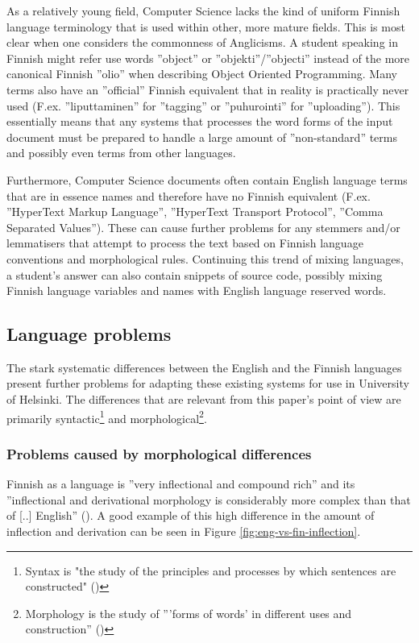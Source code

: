 \documentclass[english]{tktltiki2}
\theoremstyle{definition}
\theoremstyle{remark}
\begin{document}
As a relatively young field, Computer Science lacks the kind of uniform Finnish language terminology that is used within other, more mature fields. This is most clear when one considers the commonness of Anglicisms. A student speaking in Finnish might refer use words ''object'' or ''objekti''/''objecti'' instead of the more canonical Finnish ''olio'' when describing Object Oriented Programming. Many terms also have an ''official'' Finnish equivalent that in reality is practically never used (F.ex. ''liputtaminen'' for ''tagging'' or ''puhurointi'' for ''uploading''). This essentially means that any systems that processes the word forms of the input document must be prepared to handle a large amount of ''non-standard'' terms and possibly even terms from other languages.

Furthermore, Computer Science documents often contain English language terms that are in essence names and therefore have no Finnish equivalent (F.ex. ''HyperText Markup Language'', ''HyperText Transport Protocol'', ''Comma Separated Values''). These can cause further problems for any stemmers and/or lemmatisers that attempt to process the text based on Finnish language conventions and morphological rules. Continuing this trend of mixing languages, a student's answer can also contain snippets of source code, possibly mixing Finnish language variables and names with English language reserved words.

\subsection{Language problems}
\label{sec:eng-vs-fin}

The stark systematic differences between the English and the Finnish languages present further problems for adapting these existing systems for use in University of Helsinki. The differences that are relevant from this paper's point of view are primarily syntactic\footnote{Syntax is "the study of the principles and processes by which sentences are constructed" (\cite{chomsky02})} and morphological\footnote{Morphology is the study of '''forms of words' in different uses and construction'' (\cite{matthews91})}. 


\subsubsection{Problems caused by morphological differences}

Finnish as a language is ''very inflectional and compound rich'' and its ''inflectional and derivational morphology is considerably more complex than that of [..] English'' (\cite{korenius04}). A good example of this high difference in the amount of inflection and derivation can be seen in Figure \ref{fig:eng-vs-fin-inflection}.
\end{document}
